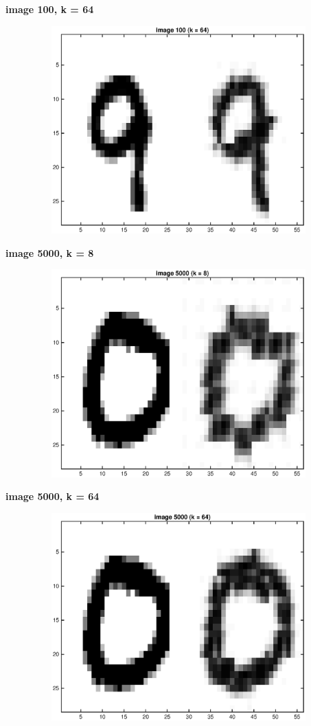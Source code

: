 \documentclass[twoside,11pt]{homework}
\begin{document}
\begin{center}
\textbf{image 100, k = 64}\par\medskip
\includegraphics[width=150mm, height = 80mm]{image-100,k-64.eps}
\end{center}

\newpage


\begin{center}
\textbf{image 5000, k = 8}\par\medskip
\includegraphics[width=150mm, height = 80mm]{image-5000,k-8.eps}
\end{center}


\begin{center}
\textbf{image 5000, k = 64}\par\medskip
\includegraphics[width=150mm, height = 80mm]{image-5000,k-64.eps}
\end{center}
\end{document}
